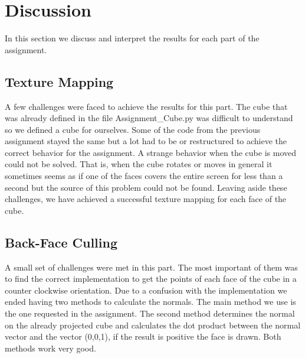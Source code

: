 \section{Discussion}
	In this section we discuss and interpret the results for each part of the assignment.
\subsection{Texture Mapping}
A few challenges were faced to achieve the results for this part. The cube that was already defined in the file Assignment_Cube.py was difficult to understand so we defined a cube for ourselves. Some of the code from the previous assignment stayed the same but a lot had to be or restructured to achieve the correct behavior for the assignment. A strange behavior when the cube is moved could not be solved. That is, when the cube rotates or moves in general it sometimes seems as if one of the faces covers the entire screen for less than a second but the source of this problem could not be found. Leaving aside these challenges, we have achieved a successful texture mapping for each face of the cube.

\subsection{Back-Face Culling}
A small set of challenges were met in this part. The most important of them was to find the correct implementation to get the points of each face of the cube in a counter clockwise orientation. Due to a confusion with the implementation we ended having two methods to calculate the normals. The main method we use is the one requested in the assignment. The second method determines the normal on the already projected cube and calculates the dot product between the normal vector and the vector (0,0,1), if the result is positive the face is drawn. Both methods work very good.